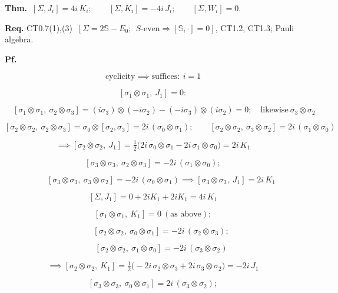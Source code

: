 \begin{theorem}\label{tag:CT1-5}
\textbf{Thm.} $\ [\Sigma,J_i]=4i\,K_i;\qquad[\Sigma,K_i]=-4i\,J_i;\qquad[\Sigma,W_i]=0.$

\textbf{Req.} CT0.7(1),(3) $\ [\Sigma=2\mathbb S-E_0;\ \ S\text{-even}\Rightarrow[\mathbb S,\cdot]=0]$, CT1.2, CT1.3; Pauli algebra.

\textbf{Pf.}

\[
\text{cyclicity}\implies\text{suffices}:\ i=1
\]

\[
[\sigma_1\otimes\sigma_1,\ J_1]=0:
\]

\[
\quad [\sigma_1\otimes\sigma_1,\ \sigma_2\otimes\sigma_3]=(i\sigma_3)\otimes(-i\sigma_2)-(-i\sigma_3)\otimes(i\sigma_2)=0;\quad\text{likewise}\ \sigma_3\otimes\sigma_2
\]

\[
[\sigma_2\otimes\sigma_2,\ \sigma_2\otimes\sigma_3]=\sigma_0\otimes[\sigma_2,\sigma_3]=2i\,(\sigma_0\otimes\sigma_1);\qquad
[\sigma_2\otimes\sigma_2,\ \sigma_3\otimes\sigma_2]=2i\,(\sigma_1\otimes\sigma_0)
\]

\[
\implies[\sigma_2\otimes\sigma_2,\ J_1]=\tfrac12\bigl(2i\,\sigma_0\otimes\sigma_1-2i\,\sigma_1\otimes\sigma_0\bigr)=2i\,K_1
\]

\[
[\sigma_3\otimes\sigma_3,\ \sigma_2\otimes\sigma_3]=-2i\,(\sigma_1\otimes\sigma_0);
\]

\[
\qquad [\sigma_3\otimes\sigma_3,\ \sigma_3\otimes\sigma_2]=-2i\,(\sigma_0\otimes\sigma_1)\implies[\sigma_3\otimes\sigma_3,\ J_1]=2i\,K_1
\]

\[
[\Sigma,J_1]=0+2iK_1+2iK_1=4i\,K_1
\]

\[
[\sigma_1\otimes\sigma_1,\ K_1]=0\ (\text{as above});
\]

\[
\qquad [\sigma_2\otimes\sigma_2,\ \sigma_0\otimes\sigma_1]=-2i\,(\sigma_2\otimes\sigma_3);
\]

\[
\qquad [\sigma_2\otimes\sigma_2,\ \sigma_1\otimes\sigma_0]=-2i\,(\sigma_3\otimes\sigma_2)
\]

\[
\implies[\sigma_2\otimes\sigma_2,\ K_1]=\tfrac12\bigl(-2i\,\sigma_2\otimes\sigma_3+2i\,\sigma_3\otimes\sigma_2\bigr)=-2i\,J_1
\]

\[
[\sigma_3\otimes\sigma_3,\ \sigma_0\otimes\sigma_1]=2i\,(\sigma_3\otimes\sigma_2);
\]


\end{theorem}
